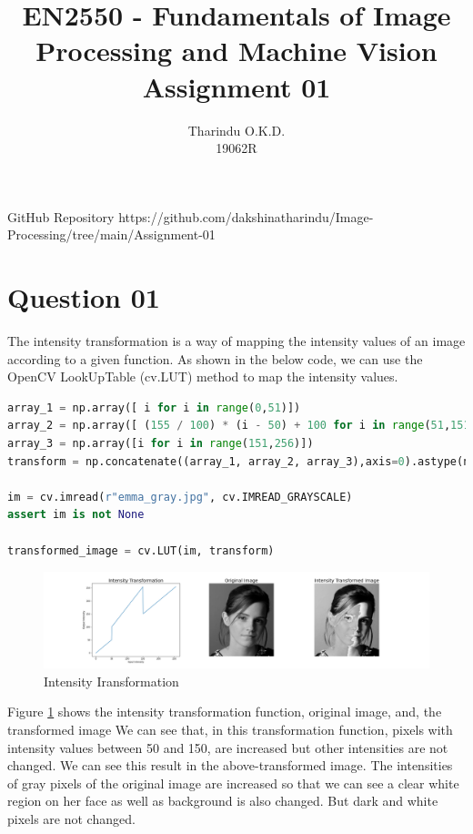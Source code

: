 \documentclass[a4paper]{article}
\title{\textbf{EN2550 - Fundamentals of Image Processing and Machine Vision}\\
Assignment 01}
\author{Tharindu O.K.D.\\19062R}
\begin{document}
\maketitle

GitHub Repository https://github.com/dakshinatharindu/Image-Processing/tree/main/Assignment-01
\section*{Question 01}

The intensity transformation is a way of mapping the intensity values of
 an image according to a given function. As shown in the below code, we
  can use the OpenCV LookUpTable (cv.LUT) method to map the intensity values.


\begin{lstlisting}[language=python, caption=Intensity Iransformation, label=q1c]
array_1 = np.array([ i for i in range(0,51)])
array_2 = np.array([ (155 / 100) * (i - 50) + 100 for i in range(51,151)])
array_3 = np.array([i for i in range(151,256)])
transform = np.concatenate((array_1, array_2, array_3),axis=0).astype(np.uint8)

im = cv.imread(r"emma_gray.jpg", cv.IMREAD_GRAYSCALE)
assert im is not None

transformed_image = cv.LUT(im, transform)
\end{lstlisting}

    
\begin{figure}[!htb]
    \centering
    \hspace*{-2cm}
    \includegraphics[width=1.25\textwidth]{../q1.png}
    \caption{Intensity Iransformation}

    \label{figq1}
\end{figure}
Figure \ref{figq1} shows the intensity transformation function,
 original image, and, the transformed image
We can see that, in this transformation function,
 pixels with intensity values between 50 and 150,
  are increased but other intensities are not changed.
   We can see this result in the above-transformed image.
    The intensities of gray pixels of the original image
     are increased so that we can see a clear white region
      on her face as well as background is also changed. But dark and white pixels are not changed.
\end{document}
